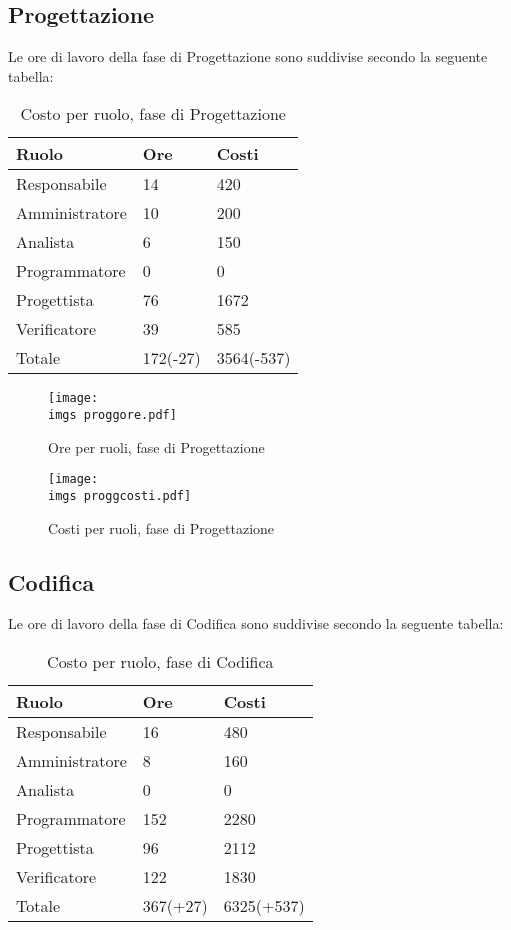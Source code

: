 {\subsection{Progettazione}{
	Le ore di lavoro della fase di Progettazione sono suddivise secondo la seguente tabella:
	\begin{table}[H]
	 	\centering
	  \begin{tabular}{p{}p{}
	  		  				p{}}
		  \toprule Ruolo & Ore  & Costi \\
		  \midrule
		  Responsabile & 14  & 420 \\
		  Amministratore & 10  & 200 \\
		  Analista & 6   & 150 \\
		  Programmatore & 0   & 0 \\
		  Progettista & 76  & 1672 \\
		  Verificatore & 39  & 585 \\
		  Totale & 172(-27)  & 3564(-537) \\
		  \bottomrule
	  \end{tabular}
	 	\label{tab:costoprogettazione}
		\caption{Costo per ruolo, fase di Progettazione}
	\end{table}
	
	\begin{figure}[H]
		\centering
		\texttt{[image: \\imgs proggore.pdf]}
		\label{fig:oreprogettazione}
		\caption{Ore per ruoli, fase di Progettazione}
	\end{figure}
	\begin{figure}[H]
		\centering
		\texttt{[image: \\imgs proggcosti.pdf]}
		\label{fig:costoprogettazione}
		\caption{Costi per ruoli, fase di Progettazione}
	\end{figure}
}
\subsection{Codifica}{
	Le ore di lavoro della fase di Codifica sono suddivise secondo la seguente tabella:
	\begin{table}[H]
		 \centering
		\begin{tabular}{p{}p{}
			  		  				p{}}
			  \toprule Ruolo & Ore  & Costi \\
			  \midrule
			  Responsabile & 16  & 480 \\
			  Amministratore & 8   & 160 \\
			  Analista & 0   & 0 \\
			  Programmatore & 152  & 2280 \\
			  Progettista & 96  & 2112 \\
			  Verificatore & 122  & 1830 \\
			  Totale & 367(+27)  & 6325(+537) \\
			  \bottomrule
		  \end{tabular}
		 \label{tab:costocodifica}
		 \caption{Costo per ruolo, fase di Codifica}
	\end{table}
	
}}
